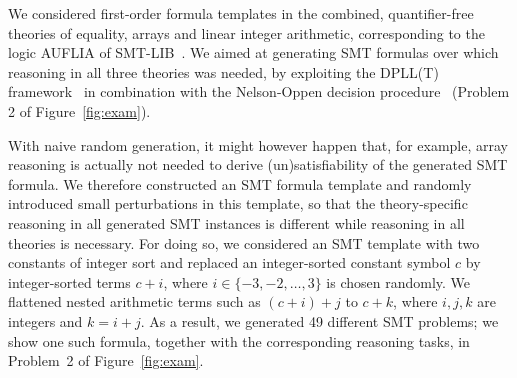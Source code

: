 We considered first-order formula templates in the combined,
quantifier-free 
theories of equality, arrays and linear integer arithmetic,
corresponding to the logic AUFLIA of
SMT-LIB~\cite{barrett2017smtlib}. We aimed at generating SMT formulas
over which reasoning in all three theories was needed, by exploiting
the DPLL(T) framework~\cite{Tinelli02} in combination with the
Nelson-Oppen decision procedure~\cite{Nelson79} (Problem 2 of Figure~\ref{fig:exam}).
%

With naive random generation, it might however happen
that, for example, array reasoning is actually not needed to derive
(un)satisfi\-ability of the generated SMT formula. We therefore constructed an
SMT formula template and randomly introduced small perturbations in this template,
so that the theory-specific reasoning in all generated SMT instances is
different while reasoning in all theories is necessary.
%
For doing so, we considered an SMT template with two constants of
integer sort and replaced an integer-sorted constant symbol $c$ by  integer-sorted terms $c+i$,
where $i \in \{-3,-2,\dots,3\}$ is chosen randomly. We flattened nested arithmetic terms such as $(c+i)+j$ to $c+k$,
where $i,j,k$ are integers and $k = i+j$. As a result, we
generated 49 different SMT problems; we show one such formula, together
with the corresponding reasoning tasks, in Problem~2 of Figure~\ref{fig:exam}.
